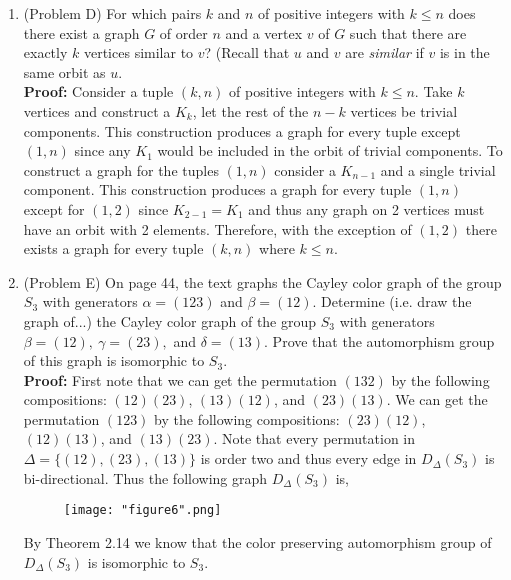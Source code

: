 \documentclass{amsart}
\begin{document}
\begin{enumerate}
\vspace{1.5in}
 

\item (Problem D) For which pairs $k$ and $n$ of positive integers with $k \leq n$ does there exist a graph $G$ of order $n$ and a vertex $v$ of $G$ such that there are exactly $k$ vertices similar to $v$? (Recall that $u$ and $v$ are \emph{similar} if $v$ is in the same orbit as $u.$\\

\textbf{Proof:} Consider a tuple $(k,n)$ of positive integers with $k \leq n$. Take $k$ vertices and construct a $K_k$, let the rest of the $n-k$ vertices be trivial components. This construction produces a graph for every tuple except $(1,n)$ since any $K_1$ would be included in the orbit of trivial components. To construct a graph for the tuples $(1,n)$ consider a $K_{n-1}$ and a single trivial component. This construction produces a graph for every tuple $(1,n)$ except for $(1,2)$ since $K_{2-1} = K_1$ and thus any graph on 2 vertices must have an orbit with 2 elements. Therefore, with the exception of $(1,2)$ there exists a graph for every tuple $(k,n)$ where $k \leq n$.
\vspace{1.5in}
 


\item (Problem E)  On page 44, the text graphs the Cayley color graph of the group $S_3$ with generators $\alpha=(123)$ and $\beta=(12).$ Determine (i.e. draw the graph of...) the Cayley color graph of the group $S_3$ with generators $\beta=(12),\: \gamma=(23),$ and $\delta=(13)$. Prove that the automorphism group of this graph is isomorphic to $S_3.$\\

\textbf{Proof:} First note that we can get the permutation $(132)$ by the following compositions: $(12)(23)$, $(13)(12)$, and $(23)(13)$. We can get the permutation $(123)$ by the following compositions: $(23)(12)$, $(12)(13)$, and $(13)(23)$. Note that every permutation in $\Delta = \{(12),(23),(13)\}$ is order two and thus every edge in $D_\Delta(S_3)$ is bi-directional. Thus the following graph $D_\Delta(S_3)$ is,

\begin{figure}[H]
\caption{}
\centering
\texttt{[image: "figure6".png]}
\end{figure}

By Theorem 2.14 we know that the color preserving automorphism group of $D_\Delta(S_3)$ is isomorphic to $S_3$.

\vspace{1.5in}



\end{enumerate}
\end{document}
